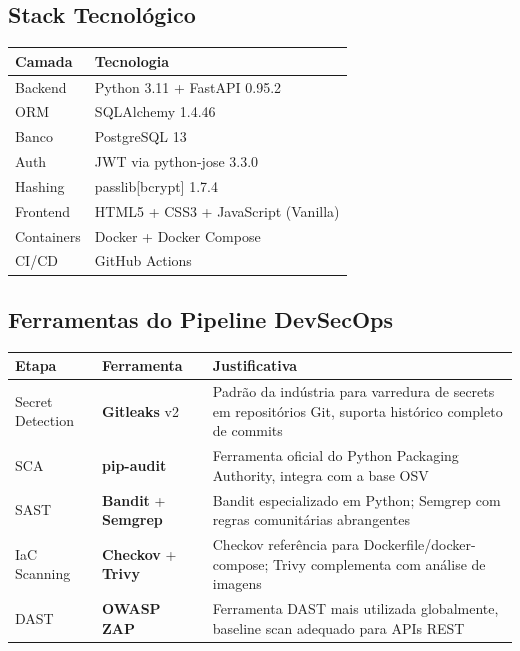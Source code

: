 \documentclass[12pt,a4paper]{article}
\begin{document}
\subsection{Stack Tecnológico}
\begin{table}[h]
\centering
\begin{tabularx}{\textwidth}{|l|X|}
\hline
\textbf{Camada} & \textbf{Tecnologia} \\ \hline
Backend & Python 3.11 + FastAPI 0.95.2 \\ \hline
ORM & SQLAlchemy 1.4.46 \\ \hline
Banco & PostgreSQL 13 \\ \hline
Auth & JWT via python-jose 3.3.0 \\ \hline
Hashing & passlib[bcrypt] 1.7.4 \\ \hline
Frontend & HTML5 + CSS3 + JavaScript (Vanilla) \\ \hline
Containers & Docker + Docker Compose \\ \hline
CI/CD & GitHub Actions \\ \hline
\end{tabularx}
\end{table}

\subsection{Ferramentas do Pipeline DevSecOps}
\begin{table}[h]
\centering
\begin{tabularx}{\textwidth}{|l|l|X|}
\hline
\textbf{Etapa} & \textbf{Ferramenta} & \textbf{Justificativa} \\ \hline
Secret Detection & \textbf{Gitleaks} v2 & Padrão da indústria para varredura de secrets em repositórios Git, suporta histórico completo de commits \\ \hline
SCA & \textbf{pip-audit} & Ferramenta oficial do Python Packaging Authority, integra com a base OSV \\ \hline
SAST & \textbf{Bandit} + \textbf{Semgrep} & Bandit especializado em Python; Semgrep com regras comunitárias abrangentes \\ \hline
IaC Scanning & \textbf{Checkov} + \textbf{Trivy} & Checkov referência para Dockerfile/docker-compose; Trivy complementa com análise de imagens \\ \hline
DAST & \textbf{OWASP ZAP} & Ferramenta DAST mais utilizada globalmente, baseline scan adequado para APIs REST \\ \hline
\end{tabularx}
\end{table}
\end{document}
